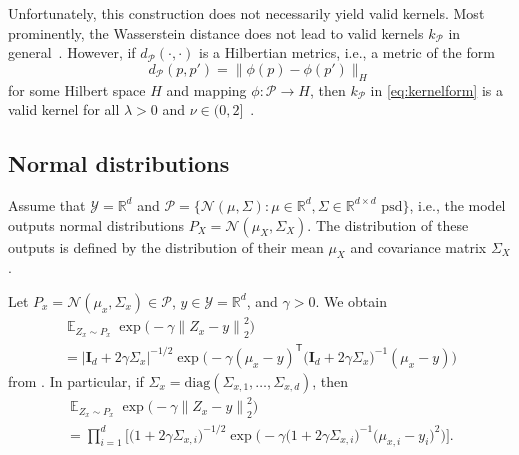 \documentclass{article}
\DeclareMathOperator{\Exp}{\mathbb{E}}
\begin{document}
Unfortunately, this construction does not necessarily yield valid kernels.
Most prominently, the Wasserstein distance does not lead to valid kernels $k_{\mathcal{P}}$ in general~\citep[Chapter~8.3]{Peyre2018}. However, if $d_{\mathcal{P}}(\cdot, \cdot)$
is a Hilbertian metrics, i.e., a metric of the form
\begin{equation*}
    d_{\mathcal{P}}(p, p') = \big\|\phi(p) - \phi(p') \big\|_{H}
\end{equation*}
for some Hilbert space $H$ and mapping $\phi \colon \mathcal{P} \to H$, then
$k_{\mathcal{P}}$ in \cref{eq:kernelform} is a valid kernel for all $\lambda > 0$ and
$\nu \in (0, 2]$~\citep[Corollary~3.3.3, Proposition~3.2.7]{Berg1984}.

\subsection{Normal distributions}
\label{app:normal}

Assume that $\mathcal{Y} = \mathbb{R}^d$ and
$\mathcal{P} = \{\mathcal{N}(\mu, \Sigma) \colon \mu \in \mathbb{R}^d, \Sigma \in \mathbb{R}^{d \times d} \text{ psd}\}$,
i.e., the model outputs normal distributions
$P_X = \mathcal{N}(\mu_X, \Sigma_X)$.
The distribution of these outputs is defined by the distribution
of their mean $\mu_X$ and covariance matrix $\Sigma_X$.

Let $P_x = \mathcal{N}(\mu_x, \Sigma_x) \in \mathcal{P}$,
$y \in \mathcal{Y} = \mathbb{R}^d$, and $\gamma > 0$. We obtain
\begin{multline*}
    \Exp_{Z_x \sim P_x} \exp{\Big(- \gamma {\|Z_x - y\|}^2_2\Big)} \\
    = {\big|\mathbf{I}_{d} + 2\gamma \Sigma_x \big|}^{-1/2} \exp{\Big(-\gamma {(\mu_x - y)}^{\mathsf{T}} {\big(\mathbf{I}_d + 2\gamma \Sigma_x
    \big)}^{-1} {(\mu_x - y)}\Big)}
\end{multline*}
from \citet[Theorem~3.2.a3]{mathai1992}. In particular, if
$\Sigma_x = \mathrm{diag}{(\Sigma_{x,1}, \ldots, \Sigma_{x,d})}$, then
\begin{multline*}
    \Exp_{Z_x \sim P_x} \exp{\Big(- \gamma {\|Z_x - y\|}^2_2\Big)} \\
    = \prod_{i=1}^{d} \bigg[{\big(1 + 2\gamma \Sigma_{x,i}\big)}^{-1/2} \exp{\Big(-\gamma {\big(1 + 2\gamma \Sigma_{x,i}\big)}^{-1} {\big(\mu_{x,i} - y_i\big)}^2 \Big)}\bigg].
\end{multline*}
\end{document}

